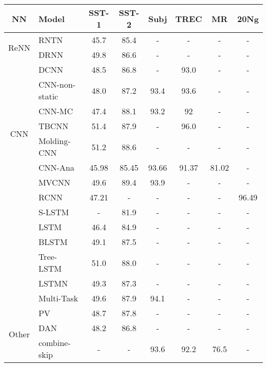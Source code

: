 \documentclass[11pt]{article}
\begin{document}
\begin{table*}[!t]
\centering
\begin{tabular}{c||l|c|c|c|c|c|c}
\hline
{\bf{NN}} & {\bf{Model}} & {\bf{SST-1}} & {\bf{SST-2}} & {\bf{Subj}} & {\bf{TREC}} & {\bf{MR}} & {\bf{20Ng}} \\
\hline
\multirow{2}{*}{ReNN}
&RNTN \cite{socher2013recursive}    &45.7    &85.4    &-    &-    &-    &-\\
&DRNN \cite{irsoy2014deep}    &49.8    &86.6    &-    &-    &-    &-\\
\hline
\multirow{8}{*}{CNN}
&DCNN \cite{kalchbrenner2014convolutional}    &48.5    &86.8    &-    &93.0    &-    &-\\
&CNN-non-static \cite{kim2014convolutional}    &48.0    &87.2    &93.4    &93.6    &-    &-\\
&CNN-MC \cite{kim2014convolutional}    &47.4    &88.1    &93.2    &92    &-    &-\\
&TBCNN\cite{mou2015discriminative}    &51.4    &87.9    &-    &96.0    &-    &-\\
&Molding-CNN \cite{lei2015molding} &51.2   &88.6    &-    &-    &-   &-\\
&CNN-Ana \cite{zhang2015sensitivity}    &45.98    &85.45    &93.66    &91.37    &81.02    &-\\
&MVCNN \cite{yin2016multichannel}    &49.6    &89.4    &93.9    &-    &-   &-\\  \hline
\multirow{7}{*}{RNN}
&RCNN \cite{lai2015recurrent}     &47.21    &-    &-    &-    &-   &96.49\\
&S-LSTM \cite{zhu2015long}    &-    &81.9    &-    &-    &-   &-\\
&LSTM \cite{tai2015improved}    &46.4    &84.9    &-    &-    &-   &-\\
&BLSTM \cite{tai2015improved}     &49.1    &87.5     &-    &-    &-   &-\\
&Tree-LSTM \cite{tai2015improved}    &51.0    &88.0    &-    &-    &-   &-\\
&LSTMN \cite{cheng2016long}    &49.3    &87.3    &-    &-    &-   &-\\
&Multi-Task \cite{liu2016recurrent}    &49.6    &87.9    &94.1    &-    &-   &-\\
\hline
\multirow{7}{*}{Other}
&PV \cite{le2014distributed}    &48.7    &87.8    &-    &-    &-   &-\\
&DAN \cite{iyyer2015deep}    &48.2    &86.8    &-    &-    &-   &-\\
&combine-skip \cite{kiros2015skip}    &-    &-    &93.6    &92.2    &76.5    &-\\

\end{tabular}
\end{table*}
\end{document}
